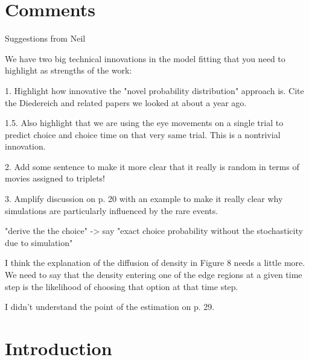 \documentclass[11pt,a4paper]{article}
\begin{document}
	
	
%
%
%

\newpage

\section{Comments}

 Suggestions from Neil

We have two big technical innovations in the model fitting that you need to highlight as strengths of the work:

1. Highlight how innovative the "novel probability distribution" approach is. Cite the Diedereich and related papers we looked at about a year ago.

1.5. Also highlight that we are using the eye movements on a single trial to predict choice and choice time on that very same trial. This is a nontrivial innovation.


2. Add some sentence to make it more clear that it really is random in terms of movies assigned to triplets!

3. Amplify discussion on p. 20 with an example to make it really clear why simulations are particularly influenced by the rare events. 



"derive the the choice" -> say "exact choice probability without the stochasticity due to simulation"

I think the explanation of the diffusion of density in Figure 8 needs a little more. We need to say that the density entering one of the edge regions at a given time step is the likelihood of choosing that option at that time step.

I didn't understand the point of the estimation on p. 29. 

\newpage

\section{Introduction} \label{chap1intro}
\end{document}
